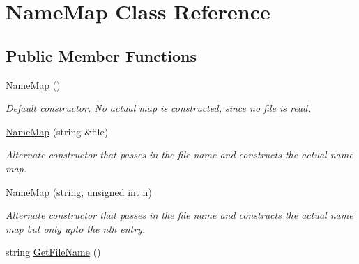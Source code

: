 \hypertarget{class_name_map}{
\section{NameMap Class Reference}
\label{class_name_map}
}
\subsection*{Public Member Functions}
\begin{DoxyCompactItemize}
\item 
\hypertarget{class_name_map_a8560d4570112d839b90be032f2af34e7}{
\hyperlink{class_name_map_a8560d4570112d839b90be032f2af34e7}{NameMap} ()}
\label{class_name_map_a8560d4570112d839b90be032f2af34e7}

\begin{DoxyCompactList}\small\item\em Default constructor. No actual map is constructed, since no file is read. \item\end{DoxyCompactList}\item 
\hypertarget{class_name_map_a65b751a2cf738a2d391aca986d5f5281}{
\hyperlink{class_name_map_a65b751a2cf738a2d391aca986d5f5281}{NameMap} (string \&file)}
\label{class_name_map_a65b751a2cf738a2d391aca986d5f5281}

\begin{DoxyCompactList}\small\item\em Alternate constructor that passes in the file name and constructs the actual name map. \item\end{DoxyCompactList}\item 
\hypertarget{class_name_map_a4874c7a4e95a4dd589e834e12faa1999}{
\hyperlink{class_name_map_a4874c7a4e95a4dd589e834e12faa1999}{NameMap} (string, unsigned int n)}
\label{class_name_map_a4874c7a4e95a4dd589e834e12faa1999}

\begin{DoxyCompactList}\small\item\em Alternate constructor that passes in the file name and constructs the actual name map but only upto the nth entry. \item\end{DoxyCompactList}\item 
\hypertarget{class_name_map_a9b58a913f6abdda24ead4f56c36a75d4}{
string \hyperlink{class_name_map_a9b58a913f6abdda24ead4f56c36a75d4}{GetFileName} ()}
\label{class_name_map_a9b58a913f6abdda24ead4f56c36a75d4}


\end{DoxyCompactItemize}
